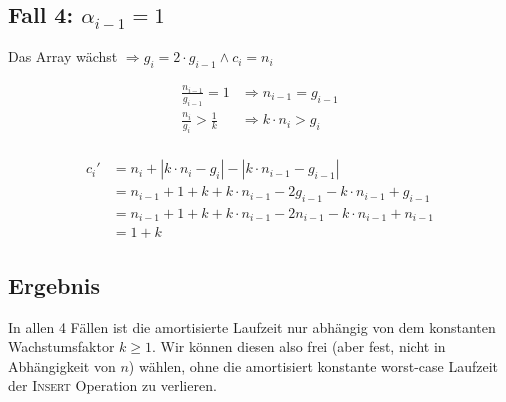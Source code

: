 \documentclass[parskip=half,a4paper]{scrartcl}
\begin{document}
\subsection*{Fall 4: $\alpha_{i-1} = 1$}

Das Array wächst
$\Rightarrow g_i = 2 \cdot g_{i-1} \land c_i = n_i$

\begin{equation}
\begin{aligned}
\frac{n_{i-1}}{g_{i-1}} = 1
 &\Rightarrow n_{i-1} = g_{i-1}\\
\frac{n_{i}}{g_{i}} > \frac{1}{k}
 &\Rightarrow k \cdot n_{i} > g_{i}\\
\end{aligned}
\end{equation}



\begin{equation}
\begin{aligned}
   c_i' &= n_i + \left|k \cdot n_i - g_i\right| - \left|k \cdot n_{i-1} - g_{i-1}\right|\\
   &= n_{i-1} + 1 + k + k \cdot n_{i-1} - 2 g_{i-1} - k \cdot n_{i-1} + g_{i-1}\\
   &= n_{i-1} + 1 + k + k \cdot n_{i-1} - 2 n_{i-1} - k \cdot n_{i-1} + n_{i-1}\\
   &= 1 + k
\end{aligned}
\end{equation}

\subsection*{Ergebnis}

In allen 4 Fällen ist die amortisierte Laufzeit nur abhängig von dem konstanten Wachstumsfaktor $k \ge 1$. Wir können diesen also frei (aber fest, nicht in Abhängigkeit von $n$) wählen, ohne die amortisiert konstante worst-case Laufzeit der \textsc{Insert} Operation zu verlieren.
\end{document}
